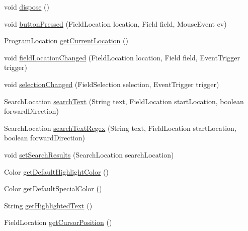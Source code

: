 \begin{DoxyCompactItemize}
\item 
void \mbox{\hyperlink{classghidra_1_1app_1_1decompiler_1_1component_1_1_decompiler_panel_a5a760268786c72bb8307a1cc11e1e3d0}{dispose}} ()
\item 
void \mbox{\hyperlink{classghidra_1_1app_1_1decompiler_1_1component_1_1_decompiler_panel_a6e2548f82106d402f3e618830ae78d1d}{button\+Pressed}} (Field\+Location location, Field field, Mouse\+Event ev)
\item 
Program\+Location \mbox{\hyperlink{classghidra_1_1app_1_1decompiler_1_1component_1_1_decompiler_panel_a090d6e48e23de12508c47d06c6bad425}{get\+Current\+Location}} ()
\item 
void \mbox{\hyperlink{classghidra_1_1app_1_1decompiler_1_1component_1_1_decompiler_panel_aa74cc3489415646273d63b999b658e30}{field\+Location\+Changed}} (Field\+Location location, Field field, Event\+Trigger trigger)
\item 
void \mbox{\hyperlink{classghidra_1_1app_1_1decompiler_1_1component_1_1_decompiler_panel_abd4a85466441f38db1df00ca36fdb804}{selection\+Changed}} (Field\+Selection selection, Event\+Trigger trigger)
\item 
Search\+Location \mbox{\hyperlink{classghidra_1_1app_1_1decompiler_1_1component_1_1_decompiler_panel_adec77ffde808184f39f911e173093426}{search\+Text}} (String text, Field\+Location start\+Location, boolean forward\+Direction)
\item 
Search\+Location \mbox{\hyperlink{classghidra_1_1app_1_1decompiler_1_1component_1_1_decompiler_panel_a71b1d0c8a33c19608fb170244bfb96a3}{search\+Text\+Regex}} (String text, Field\+Location start\+Location, boolean forward\+Direction)
\item 
void \mbox{\hyperlink{classghidra_1_1app_1_1decompiler_1_1component_1_1_decompiler_panel_aa4d1b7d9352119a5d3173cb498a4e078}{set\+Search\+Results}} (Search\+Location search\+Location)
\item 
Color \mbox{\hyperlink{classghidra_1_1app_1_1decompiler_1_1component_1_1_decompiler_panel_a31b55910dd10b4b190eb729fcea60eb3}{get\+Default\+Highlight\+Color}} ()
\item 
Color \mbox{\hyperlink{classghidra_1_1app_1_1decompiler_1_1component_1_1_decompiler_panel_a28efeaf147c13c36846a05030f8e2532}{get\+Default\+Special\+Color}} ()
\item 
String \mbox{\hyperlink{classghidra_1_1app_1_1decompiler_1_1component_1_1_decompiler_panel_aac878cbe7f1841efe8649b7ec1a731cd}{get\+Highlighted\+Text}} ()
\item 
Field\+Location \mbox{\hyperlink{classghidra_1_1app_1_1decompiler_1_1component_1_1_decompiler_panel_ad986829e7678aec3ef2f493d389f7ac1}{get\+Cursor\+Position}} ()

\end{DoxyCompactItemize}
